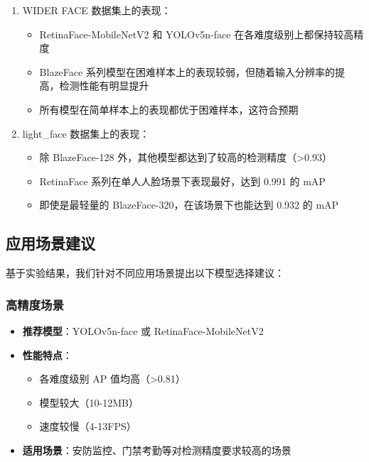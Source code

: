 \documentclass{article}
\begin{document}
\begin{enumerate}
    \item WIDER FACE 数据集上的表现：
    \begin{itemize}
        \item RetinaFace-MobileNetV2 和 YOLOv5n-face 在各难度级别上都保持较高精度
        \item BlazeFace 系列模型在困难样本上的表现较弱，但随着输入分辨率的提高，检测性能有明显提升
        \item 所有模型在简单样本上的表现都优于困难样本，这符合预期
    \end{itemize}
    
    \item light\_face 数据集上的表现：
    \begin{itemize}
        \item 除 BlazeFace-128 外，其他模型都达到了较高的检测精度（>0.93）
        \item RetinaFace 系列在单人人脸场景下表现最好，达到 0.991 的 mAP
        \item 即使是最轻量的 BlazeFace-320，在该场景下也能达到 0.932 的 mAP
    \end{itemize}
\end{enumerate}

\subsection{应用场景建议}

基于实验结果，我们针对不同应用场景提出以下模型选择建议：

\subsubsection{高精度场景}
\begin{itemize}
    \item \textbf{推荐模型}：YOLOv5n-face 或 RetinaFace-MobileNetV2
    \item \textbf{性能特点}：
    \begin{itemize}
        \item 各难度级别 AP 值均高（>0.81）
        \item 模型较大（10-12MB）
        \item 速度较慢（4-13FPS）
    \end{itemize}
    \item \textbf{适用场景}：安防监控、门禁考勤等对检测精度要求较高的场景
\end{itemize}
\end{document}
